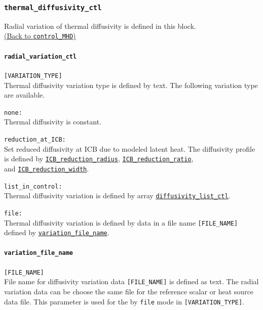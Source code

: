 \subsubsection{\tt thermal\_diffusivity\_ctl}
\label{href_t:thermal_diffusivity_ctl}
Radial variation of thermal diffusivity is defined in this block. \\
\hyperref[href_i:thermal_diffusivity_ctl]{(Back to {\tt control\_MHD})}

\paragraph{\tt radial\_variation\_ctl}
\label{href_t:radial_variation_ctl}
\verb|[VARIATION_TYPE]| \\
Thermal diffusivity variation type is defined by text. The following variation type are available. 
%
\begin{description}
\item{\tt none: }   \\
Thermal diffusivity is constant.
\item{\tt reduction\_at\_ICB: }   \\
Set reduced diffusivity at ICB due to modeled latent heat. The diffusivity profile is defined by \hyperref[href_t:ICB_reduction_radius]{\tt ICB\_reduction\_radius}, \hyperref[href_t:ICB_reduction_ratio]{\tt ICB\_reduction\_ratio}, \\
and \hyperref[href_t:ICB_reduction_width]{\tt ICB\_reduction\_width}.
\item{\tt list\_in\_control: }   \\
Thermal diffusivity variation is defined by array \hyperref[href_t:diffusivity_list_ctl]{\tt diffusivity\_list\_ctl}.
\item{\tt file: }   \\
Thermal diffusivity variation is defined by data in a file name {\tt [FILE\_NAME]} defined by \hyperref[href_t:variation_file_name]{\tt variation\_file\_name}.
\end{description}
%

\paragraph{\tt variation\_file\_name}
\label{href_t:variation_file_name}
\verb|[FILE_NAME]| \\
File name for diffusivity variation data {\tt [FILE\_NAME]} is defined as text. The radial variation data can be choose the same file for the reference scalar or heat source data file. This parameter is used for the by {\tt file} mode in {\tt [VARIATION\_TYPE]}.

